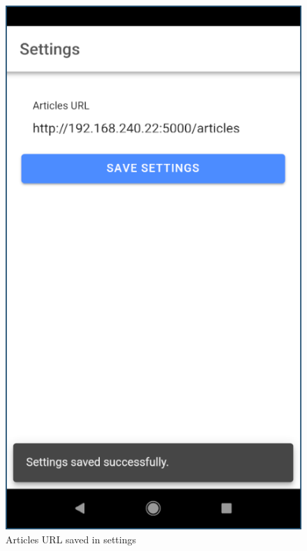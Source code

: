 \documentclass[12pt]{report}
\begin{document}
\begin{figure}
    \centering
    \includegraphics[scale=0.5]{images/avd-settings-saved.png}
    \caption{Articles URL saved in settings}
    \label{fig:avd-settings-saved}
\end{figure}
\end{document}
